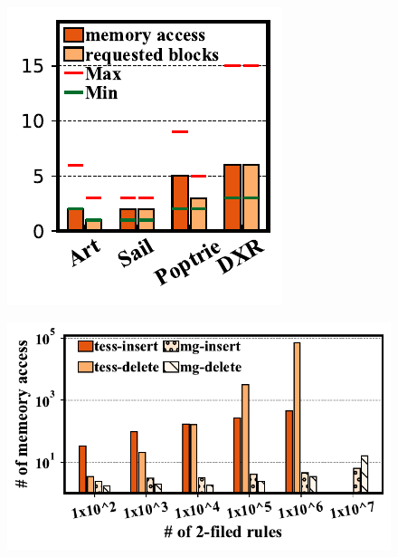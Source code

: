 \documentclass[a4paper]{article}
\begin{document}
    \begin{figure}[htbp]
        \includegraphics{../result/example-pdf/example8.pdf}
    \end{figure}

    \begin{figure}[htbp]
        \includegraphics[width=\linewidth]{../result/example-pdf/example9.pdf}
    \end{figure}
\end{document}
